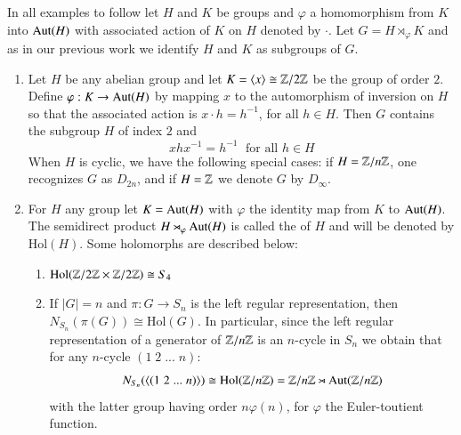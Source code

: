 \documentclass[12pt, a4paper, oneside, openright, titlepage]{book}
\begin{document}
\begin{eg}
    In all examples to follow let $H$ and $K$ be groups and $\varphi$ a homomorphism from $K$ into $\operatorname{Aut}(H)$ with associated action of $K$ on $H$ denoted by $\cdot$. Let $G = H\rtimes_{\varphi}K$ and as in our previous work we identify $H$ and $K$ as subgroups of $G$. 
    \begin{enumerate}
        \item Let $H$ be any abelian group and let $K = \langle x \rangle \cong \mathbb Z/2\mathbb Z$ be the group of order $2$. Define $\varphi:K\rightarrow \operatorname{Aut}(H)$ by mapping $x$ to the automorphism of inversion on $H$ so that the associated action is $x\cdot h = h^{-1}$, for all $h \in H$. Then $G$ contains the subgroup $H$ of index $2$ and \begin{equation*}
                xhx^{-1} = h^{-1}\;\text{ for all } h \in H
        \end{equation*}
            When $H$ is cyclic, we have the following special cases: if $H = \mathbb Z/n\mathbb Z$, one recognizes $G$ as $D_{2n}$, and if $H = \mathbb Z$ we denote $G$ by $D_{\infty}$.
        \item For $H$ any group let $K = \operatorname{Aut}(H)$ with $\varphi$ the identity map from $K$ to $\operatorname{Aut}(H)$. The semidirect product $H\rtimes_{\varphi}\operatorname{Aut}(H)$ is called the  of $H$ and will be denoted by $\text{Hol}(H)$. Some holomorphs are described below: \begin{enumerate}
                \item $\text{Hol}(\mathbb Z/2\mathbb Z\times\mathbb Z/2\mathbb Z)\cong S_4$
                \item If $|G| = n$ and $\pi:G\rightarrow S_n$ is the left regular representation, then $N_{S_n}(\pi(G)) \cong \text{Hol}(G)$. In particular, since the left regular representation of a generator of $\mathbb Z/n\mathbb Z$ is an $n$-cycle in $S_n$ we obtain that for any $n$-cycle $(1\;2\;...\;n)$: \begin{equation*}
                        N_{S_n}(\langle(1\;2\;...\;n)\rangle) \cong \text{Hol}(\mathbb Z/n\mathbb Z)=\mathbb Z/n\mathbb Z\rtimes \operatorname{Aut}(\mathbb Z/n\mathbb Z)
                \end{equation*}
                with the latter group having order $n\varphi(n)$, for $\varphi$ the Euler-toutient function.
        \end{enumerate}
    \end{enumerate}
\end{eg}
\end{document}
